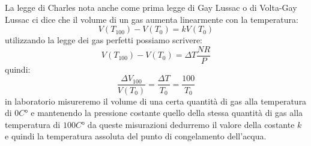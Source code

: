 \documentclass[a4paper,10pt,oneside]{article}
\begin{document}
La legge di Charles nota anche come prima legge di Gay Lussac o di Volta-Gay Lussac ci dice che il volume di un gas aumenta linearmente con la temperatura:
\begin{equation}
 V(T_100)-V(T_0)=kV(T_0)
\end{equation}
utilizzando la legge dei gas perfetti possiamo scrivere:
\begin{equation}
 V(T_100)-V(T_0)=\Delta T\frac{NR}{P}
\end{equation}
quindi:
\begin{equation}
\frac{\Delta V_{100}}{V(T_0)}=\frac{\Delta T}{T_0}=\frac{100}{T_0}
\end{equation}
in laboratorio misureremo il volume di una certa quantità di gas alla temperatura di $0C°$ e mantenendo la pressione costante quello della stessa quantità di gas alla temperatura di $100C°$ da queste misurazioni dedurremo il valore della costante $k$ e quindi la temperatura assoluta del punto di congelamento dell'acqua.
\end{document}
